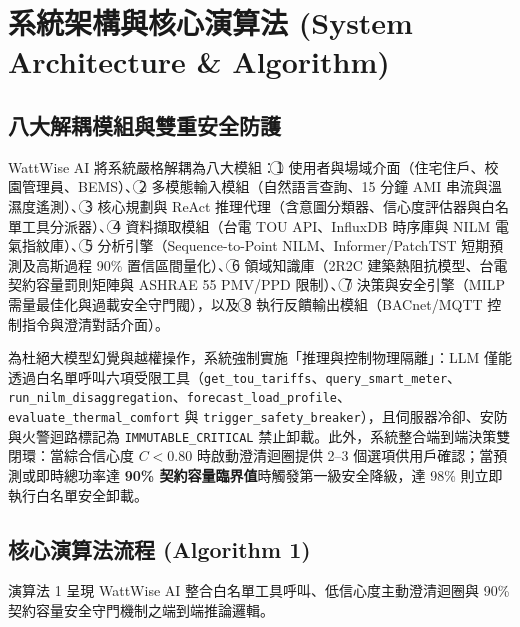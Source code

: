 \documentclass[conference]{IEEEtran}
\begin{document}
\section{系統架構與核心演算法 (System Architecture \& Algorithm)}

\subsection{八大解耦模組與雙重安全防護}
WattWise AI 將系統嚴格解耦為八大模組：\textcircled{1} 使用者與場域介面（住宅住戶、校園管理員、BEMS）、\textcircled{2} 多模態輸入模組（自然語言查詢、15 分鐘 AMI 串流與溫濕度遙測）、\textcircled{3} 核心規劃與 ReAct 推理代理（含意圖分類器、信心度評估器與白名單工具分派器）、\textcircled{4} 資料擷取模組（台電 TOU API、InfluxDB 時序庫與 NILM 電氣指紋庫）、\textcircled{5} 分析引擎（Sequence-to-Point NILM、Informer/PatchTST 短期預測及高斯過程 90\% 置信區間量化）、\textcircled{6} 領域知識庫（2R2C 建築熱阻抗模型、台電契約容量罰則矩陣與 ASHRAE 55 PMV/PPD 限制）、\textcircled{7} 決策與安全引擎（MILP 需量最佳化與過載安全守門閥），以及 \textcircled{8} 執行反饋輸出模組（BACnet/MQTT 控制指令與澄清對話介面）。

為杜絕大模型幻覺與越權操作，系統強制實施「推理與控制物理隔離」：LLM 僅能透過白名單呼叫六項受限工具（\texttt{get\_tou\_tariffs}、\texttt{query\_smart\_meter}、\texttt{run\_nilm\_disaggregation}、\texttt{forecast\_load\_profile}、\texttt{evaluate\_thermal\_comfort} 與 \texttt{trigger\_safety\_breaker}），且伺服器冷卻、安防與火警迴路標記為 \texttt{IMMUTABLE\_CRITICAL} 禁止卸載。此外，系統整合端到端決策雙閉環：當綜合信心度 $C < 0.80$ 時啟動澄清迴圈提供 2--3 個選項供用戶確認；當預測或即時總功率達 \textbf{90\% 契約容量臨界值}時觸發第一級安全降級，達 98\% 則立即執行白名單安全卸載。

\subsection{核心演算法流程 (Algorithm 1)}
演算法 1 呈現 WattWise AI 整合白名單工具呼叫、低信心度主動澄清迴圈與 90\% 契約容量安全守門機制之端到端推論邏輯。
\end{document}
